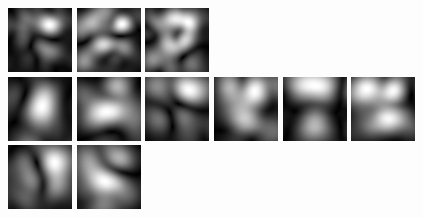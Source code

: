 \begin{figure}
\begin{center}
 \includegraphics[scale=0.5]{ch4/figures/mag_2_5.jpg}
 \includegraphics[scale=0.5]{ch4/figures/mag_2_6.jpg}
 \includegraphics[scale=0.5]{ch4/figures/mag_2_7.jpg}\\
 \includegraphics[scale=0.5]{ch4/figures/mag_3_0.jpg}
 \includegraphics[scale=0.5]{ch4/figures/mag_3_1.jpg}
 \includegraphics[scale=0.5]{ch4/figures/mag_3_2.jpg}
 \includegraphics[scale=0.5]{ch4/figures/mag_3_3.jpg}
 \includegraphics[scale=0.5]{ch4/figures/mag_3_4.jpg}
 \includegraphics[scale=0.5]{ch4/figures/mag_3_5.jpg}
 \includegraphics[scale=0.5]{ch4/figures/mag_3_6.jpg}
 \includegraphics[scale=0.5]{ch4/figures/mag_3_7.jpg}
 \caption{}
\end{center}
\label{fig:magresponses}
\end{figure} 

